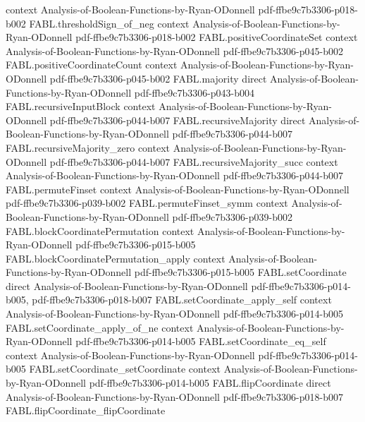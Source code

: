\begin{theorem}
  {context}
  {Analysis-of-Boolean-Functions-by-Ryan-ODonnell}
  {pdf-ffbe9c7b3306-p018-b002}
\proofstep
  {FABL.thresholdSign_of_neg}
  {context}
  {Analysis-of-Boolean-Functions-by-Ryan-ODonnell}
  {pdf-ffbe9c7b3306-p018-b002}
\proofstep
  {FABL.positiveCoordinateSet}
  {context}
  {Analysis-of-Boolean-Functions-by-Ryan-ODonnell}
  {pdf-ffbe9c7b3306-p045-b002}
\proofstep
  {FABL.positiveCoordinateCount}
  {context}
  {Analysis-of-Boolean-Functions-by-Ryan-ODonnell}
  {pdf-ffbe9c7b3306-p045-b002}
\proofstep
  {FABL.majority}
  {direct}
  {Analysis-of-Boolean-Functions-by-Ryan-ODonnell}
  {pdf-ffbe9c7b3306-p043-b004}
\proofstep
  {FABL.recursiveInputBlock}
  {context}
  {Analysis-of-Boolean-Functions-by-Ryan-ODonnell}
  {pdf-ffbe9c7b3306-p044-b007}
\proofstep
  {FABL.recursiveMajority}
  {direct}
  {Analysis-of-Boolean-Functions-by-Ryan-ODonnell}
  {pdf-ffbe9c7b3306-p044-b007}
\proofstep
  {FABL.recursiveMajority_zero}
  {context}
  {Analysis-of-Boolean-Functions-by-Ryan-ODonnell}
  {pdf-ffbe9c7b3306-p044-b007}
\proofstep
  {FABL.recursiveMajority_succ}
  {context}
  {Analysis-of-Boolean-Functions-by-Ryan-ODonnell}
  {pdf-ffbe9c7b3306-p044-b007}
\proofstep
  {FABL.permuteFinset}
  {context}
  {Analysis-of-Boolean-Functions-by-Ryan-ODonnell}
  {pdf-ffbe9c7b3306-p039-b002}
\proofstep
  {FABL.permuteFinset_symm}
  {context}
  {Analysis-of-Boolean-Functions-by-Ryan-ODonnell}
  {pdf-ffbe9c7b3306-p039-b002}
\proofstep
  {FABL.blockCoordinatePermutation}
  {context}
  {Analysis-of-Boolean-Functions-by-Ryan-ODonnell}
  {pdf-ffbe9c7b3306-p015-b005}
\proofstep
  {FABL.blockCoordinatePermutation_apply}
  {context}
  {Analysis-of-Boolean-Functions-by-Ryan-ODonnell}
  {pdf-ffbe9c7b3306-p015-b005}
\proofstep
  {FABL.setCoordinate}
  {direct}
  {Analysis-of-Boolean-Functions-by-Ryan-ODonnell}
  {pdf-ffbe9c7b3306-p014-b005,
    pdf-ffbe9c7b3306-p018-b007}
\proofstep
  {FABL.setCoordinate_apply_self}
  {context}
  {Analysis-of-Boolean-Functions-by-Ryan-ODonnell}
  {pdf-ffbe9c7b3306-p014-b005}
\proofstep
  {FABL.setCoordinate_apply_of_ne}
  {context}
  {Analysis-of-Boolean-Functions-by-Ryan-ODonnell}
  {pdf-ffbe9c7b3306-p014-b005}
\proofstep
  {FABL.setCoordinate_eq_self}
  {context}
  {Analysis-of-Boolean-Functions-by-Ryan-ODonnell}
  {pdf-ffbe9c7b3306-p014-b005}
\proofstep
  {FABL.setCoordinate_setCoordinate}
  {context}
  {Analysis-of-Boolean-Functions-by-Ryan-ODonnell}
  {pdf-ffbe9c7b3306-p014-b005}
\proofstep
  {FABL.flipCoordinate}
  {direct}
  {Analysis-of-Boolean-Functions-by-Ryan-ODonnell}
  {pdf-ffbe9c7b3306-p018-b007}
\proofstep
  {FABL.flipCoordinate_flipCoordinate}

\end{theorem}
